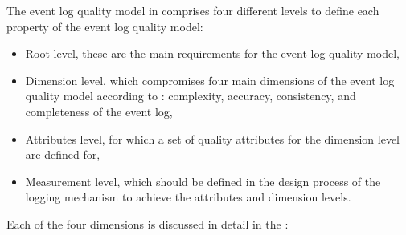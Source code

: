 \clearpage

The event log quality model in  comprises four different levels to define each property of the event log quality model:

\begin{itemize}
	\item Root level, these are the main requirements for the event log quality model,
	\item Dimension level, which compromises four main dimensions of the event log quality model according to \cite{Kherbouche2017}: complexity, accuracy, consistency, and completeness of the event log,
	\item Attributes level, for which a set of quality attributes for the dimension level are defined for,
	\item Measurement level, which should be defined in the design process of the logging mechanism to achieve the attributes and dimension levels.
\end{itemize}

Each of the four dimensions is discussed in detail in the :

